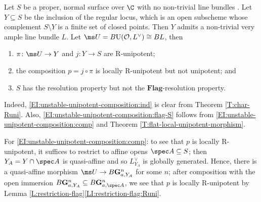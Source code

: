 \documentclass[reqno,a4paper]{amsart}
\numberwithin{Theorem}{section}
\newcommand{\Orb}{\mathcal{O}}
\renewcommand{\U}{\mathrm{U}}
\newcommand{\Flag}{\mathbf{Flag}}
\theoremstyle{plain}
\theoremstyle{remark}
\newcommand{\classB}{B}
\begin{document}
\begin{Example}\label{E:unstable-unipotent-composition}
  Let $S$ be a proper, normal surface over $\C$
  with no non-trivial line bundles
  \cite{schroer-non-proj-surfaces}. Let $Y \subseteq S$ be the inclusion of the regular
  locus, which is an open subscheme whose complement $S\setminus Y$
  is a finite set of closed points. Then $Y$ admits a non-trivial very ample line
  bundle $L$. Let $\ms U = \classB \U(\Orb,L^\vee) \cong BL$, then
  \begin{enumerate}
  \item \label{EI:unstable-unipotent-composition:ind}
    $\pi \colon \ms U \to Y$ and $j \colon Y \to S$ are
    R-unipotent;
  \item \label{EI:unstable-unipotent-composition:comp} the composition $p=j \circ \pi$ is locally R-unipotent but not
    unipotent; and
  \item \label{EI:unstable-unipotent-composition:flag-S} $S$ has the
    resolution property but not the $\Flag$-resolution property.
  \end{enumerate}
  Indeed, \eqref{EI:unstable-unipotent-composition:ind} is clear from
  Theorem \ref{T:char-Runi}. Also,
  \eqref{EI:unstable-unipotent-composition:flag-S} follows from
  \eqref{EI:unstable-unipotent-composition:comp} and Theorem
  \ref{T:flat-local-unipotent-morphism}.

  For \eqref{EI:unstable-unipotent-composition:comp}: to see that $p$
  is locally R-unipotent, it suffices to restrict to affine opens
  $\spec A \subseteq S$; then $Y_A = Y\cap \spec A$ is quasi-affine
  and so $L_{Y_A}^{\vee}$ is globally generated. Hence, there is a
  quasi-affine morphism $\ms U \to B\mathbf{G}_{a,Y_A}^n$ for some
  $n$; after composition with the open immersion
  $B\mathbf{G}_{a,Y_A}^n \subseteq B\mathbf{G}_{a,\spec A}^n$, we see
  that $p$ is locally R-unipotent by Lemma \ref{L:restriction-flag}\eqref{LI:restriction-flag:Runi}.


\end{Example}
\end{document}
